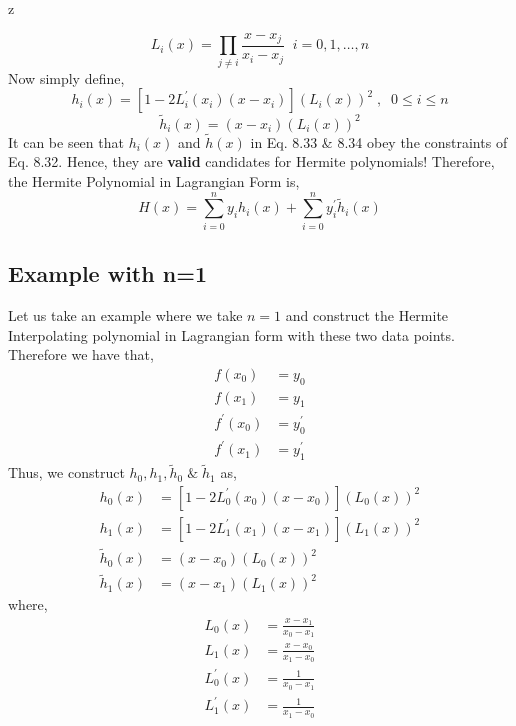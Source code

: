 z\documentclass[a4paper,12pt,twoside]{book}
\newcommand{\nll}[0]{\newline\newline}
\begin{document}
\begin{equation*}
L_i(x) = \prod_{j\neq i} \frac{x-x_j}{x_i -x_j}\;\; i = 0,1,\dots,n
\end{equation*}
Now simply define,
\begin{equation}
     \boxed{h_i(x) = \left[ 1-2L_i^\prime(x_i)(x-x_i) \right]\left(L_i(x)\right)^2\;,\;\;0\le i\le n}
\end{equation}
\begin{equation}
    \boxed{\tilde{h}_i(x) = (x-x_i)\left(L_i(x)\right)^2}
\end{equation}
It can be seen that $h_i(x)$ and $\tilde{h}(x)$ in Eq. 8.33 \& 8.34 obey the constraints of Eq. 8.32. Hence, they are \textbf{valid} candidates for Hermite polynomials!
\nll
Therefore, the Hermite Polynomial in Lagrangian Form is,
\begin{equation}
    \boxed{H(x) = \sum_{i=0}^n y_i h_i(x) + \sum_{i=0}^n y_i^\prime \tilde{h}_i(x)}
\end{equation}
\subsection{Example with n=1}
Let us take an example where we take $n=1$ and construct the Hermite Interpolating polynomial in Lagrangian form with these two data points.
\nll
Therefore we have that,
\begin{equation*}
    \begin{split}
        f(x_0)&=y_0\\
        f(x_1)&=y_1\\
        f^\prime(x_0) &=y^\prime_0\\
        f^\prime(x_1)&=y^\prime_1
    \end{split}
\end{equation*}
Thus, we construct $h_0, h_1, \tilde{h}_0\; \&\; \tilde{h}_1$ as,
\begin{equation*}
    \begin{split}
        h_0(x) &= [1-2L_0^\prime(x_0)(x-x_0)](L_0(x))^2\\
        h_1(x) &= [1-2L_1^\prime(x_1)(x-x_1)](L_1(x))^2\\
        \tilde{h}_0(x) &= (x-x_0)(L_0(x))^2\\
        \tilde{h}_1(x) &= (x-x_1)(L_1(x))^2
    \end{split}
\end{equation*}
where,
\begin{equation*}
    \begin{split}
        L_0(x) &= \frac{x-x_1}{x_0-x_1}\\
        L_1(x) &= \frac{x-x_0}{x_1-x_0}\\
        L_0^\prime(x) &= \frac{1}{x_0-x_1}\\
        L_1^\prime(x) &= \frac{1}{x_1-x_0}
    \end{split}
\end{equation*}
\end{document}
